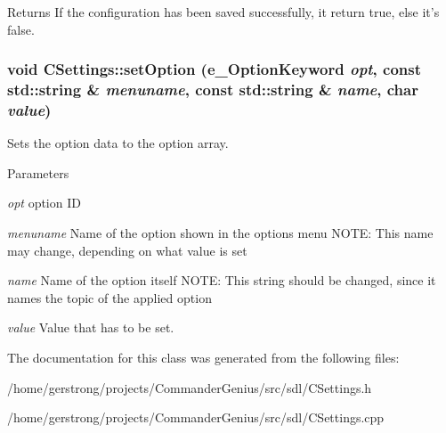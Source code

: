 \begin{DoxyReturn}{Returns}
If the configuration has been saved successfully, it return true, else it's false. 
\end{DoxyReturn}
\hypertarget{class_c_settings_ab6d30212b51e791ddca78aeb735e45b4}{
\subsubsection[{setOption}]{\setlength{\rightskip}{0pt plus 5cm}void CSettings::setOption (e\_\-OptionKeyword {\em opt}, \/  const std::string \& {\em menuname}, \/  const std::string \& {\em name}, \/  char {\em value})}}
\label{class_c_settings_ab6d30212b51e791ddca78aeb735e45b4}


Sets the option data to the option array. 


\begin{DoxyParams}{Parameters}
\item[{\em opt}]option ID \item[{\em menuname}]Name of the option shown in the options menu NOTE: This name may change, depending on what value is set \item[{\em name}]Name of the option itself NOTE: This string should be changed, since it names the topic of the applied option \item[{\em value}]Value that has to be set. \end{DoxyParams}


The documentation for this class was generated from the following files:\begin{DoxyCompactItemize}
\item 
/home/gerstrong/projects/CommanderGenius/src/sdl/CSettings.h\item 
/home/gerstrong/projects/CommanderGenius/src/sdl/CSettings.cpp\end{DoxyCompactItemize}
